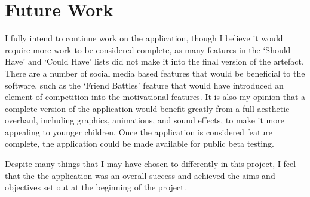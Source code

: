 \section{Future Work}
I fully intend to continue work on the application, though I believe it would require more work to be considered complete, as many features in the `Should Have' and `Could Have' lists did not make it into the final version of the artefact.
There are a number of social media based features that would be beneficial to the software, such as the `Friend Battles' feature that would have introduced an element of competition into the motivational features.
It is also my opinion that a complete version of the application would benefit greatly from a full aesthetic overhaul, including graphics, animations, and sound effects, to make it more appealing to younger children.
Once the application is considered feature complete, the application could be made available for public beta testing.

Despite many things that I may have chosen to differently in this project, I feel that the the application was an overall success and achieved the aims and objectives set out at the beginning of the project.